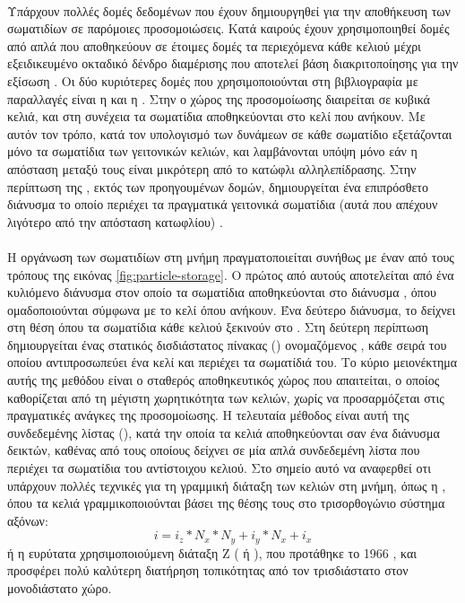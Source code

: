 \paragraph{} Υπάρχουν πολλές δομές δεδομένων που έχουν δημιουργηθεί για την αποθήκευση των
σωματιδίων σε παρόμοιες προσομοιώσεις. Κατά καιρούς έχουν χρησιμοποιηθεί δομές από απλά
 που αποθηκεύουν σε έτοιμες δομές τα περιεχόμενα κάθε κελιού
\cite{wang2012real} μέχρι εξειδικευμένο οκταδικό δένδρο διαμέρισης  που
αποτελεί βάση διακριτοποίησης για την εξίσωση 
\cite{losasso2004simulating}. Οι δύο κυριότερες δομές που χρησιμοποιούνται στη
βιβλιογραφία με παραλλαγές είναι η  και η . Στην  ο χώρος της προσομοίωσης διαιρείται σε κυβικά κελιά, και στη
συνέχεια τα σωματίδια αποθηκεύονται στο κελί που ανήκουν. Με αυτόν τον τρόπο, κατά τον
υπολογισμό των δυνάμεων σε κάθε σωματίδιο εξετάζονται μόνο τα σωματίδια των γειτονικών
κελιών, και λαμβάνονται υπόψη μόνο εάν η απόσταση μεταξύ τους είναι μικρότερη από το
κατώφλι αλληλεπίδρασης. Στην περίπτωση της , εκτός των προηγουμένων δομών,
δημιουργείται ένα επιπρόσθετο διάνυσμα το οποίο περιέχει τα πραγματικά γειτονικά σωματίδια
(αυτά που απέχουν λιγότερο από την απόσταση κατωφλίου) \cite{dominguez2011}.

\paragraph{} Η οργάνωση των σωματιδίων στη μνήμη πραγματοποιείται συνήθως με έναν από τους
τρόπους της εικόνας \ref{fig:particle-storage}. Ο πρώτος από αυτούς αποτελείται από ένα
κυλιόμενο διάνυσμα  στον οποίο τα σωματίδια αποθηκεύονται στο διάνυσμα
, όπου ομαδοποιούνται σύμφωνα με το κελί όπου ανήκουν. Ένα δεύτερο
διάνυσμα, το  δείχνει στη θέση όπου τα σωματίδια κάθε κελιού ξεκινούν στο
. Στη δεύτερη περίπτωση δημιουργείται ένας στατικός δισδιάστατος πίνακας
() ονομαζόμενος , κάθε σειρά του οποίου αντιπροσωπεύει
ένα κελί και περιέχει τα σωματίδιά του. Το κύριο μειονέκτημα αυτής της μεθόδου είναι ο
σταθερός αποθηκευτικός χώρος που απαιτείται, ο οποίος καθορίζεται από τη μέγιστη
χωρητικότητα των κελιών, χωρίς να προσαρμόζεται στις πραγματικές ανάγκες της
προσομοίωσης. Η τελευταία μέθοδος είναι αυτή της συνδεδεμένης λίστας (),
κατά την οποία τα κελιά αποθηκεύονται σαν ένα διάνυσμα δεικτών, καθένας από τους οποίους
δείχνει σε μία απλά συνδεδεμένη λίστα που περιέχει τα σωματίδια του αντίστοιχου
κελιού. Στο σημείο αυτό να αναφερθεί οτι υπάρχουν πολλές τεχνικές για τη γραμμική διάταξη
των κελιών στη μνήμη, όπως η , όπου τα κελιά γραμμικοποιούνται βάσει της
θέσης τους στο τρισορθογώνιο σύστημα αξόνων:
\[
  i = i_z * N_x * N_y + i_y * N_x + i_x
\]
ή η ευρύτατα χρησιμοποιούμενη διάταξη Ζ ( ή ), που
προτάθηκε το 1966 \cite{morton1966}, και προσφέρει πολύ καλύτερη διατήρηση τοπικότητας από
τον τρισδιάστατο στον μονοδιάστατο χώρο.

